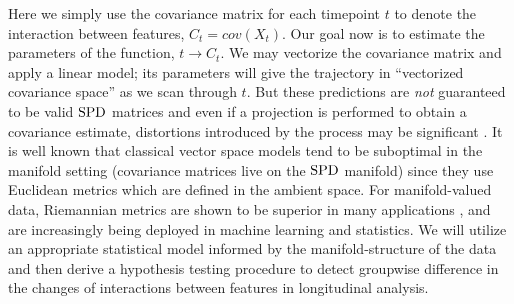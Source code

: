 Here we simply use the covariance matrix for each timepoint $t$ to denote the interaction between features, 
$C_t = cov(X_t)$. 
Our goal now is to estimate the parameters of the function, $t \to C_t$. 
We may vectorize the covariance matrix and apply a linear model; its parameters
will give the trajectory in ``vectorized covariance space'' as we scan through $t$. 
But these predictions are {\em not} guaranteed to be valid  $\text{SPD}$ matrices and even if a projection is performed to obtain a covariance estimate, distortions introduced by the process may be significant \citep{fletcher2013geodesic}. 
It is well known that classical vector space models tend to be suboptimal 
in the manifold setting (covariance matrices live on the $\text{SPD}$ manifold)
since they use Euclidean metrics which are defined in the ambient space. For manifold-valued data, Riemannian metrics are shown to be superior in many applications 
\citep{fletcher2007riemannian,banerjee2015nonlinear,jayasumanakernel,tuzel2007human}, 
and are increasingly being deployed in machine learning and statistics. 
We will utilize an appropriate statistical model informed by the manifold-structure of the data and 
then derive a hypothesis 
testing procedure to detect groupwise difference in the changes of interactions between features in longitudinal analysis.
